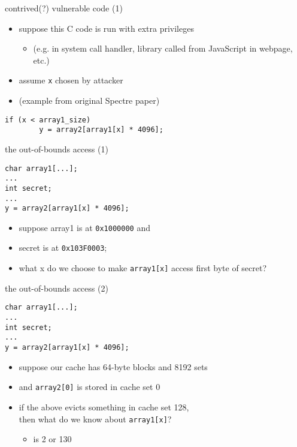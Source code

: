 \begin{frame}[fragile]{contrived(?) vulnerable code (1)}
\begin{itemize}
\item suppose this C code is run with extra privileges
    \begin{itemize}
    \item (e.g. in system call handler, library called from JavaScript in webpage, etc.)
    \end{itemize}
\item assume \texttt{x} chosen by attacker
\item (example from original Spectre paper)
\end{itemize}
\begin{lstlisting}
if (x < array1_size)
        y = array2[array1[x] * 4096];
\end{lstlisting}
\end{frame}

\begin{frame}[fragile]{the out-of-bounds access (1)}
\begin{lstlisting}
char array1[...];
...
int secret;
...
y = array2[array1[x] * 4096];
\end{lstlisting}
\begin{itemize}
\item suppose array1 is at \texttt{0x1000000} and
\item secret is at \texttt{0x103F0003};
\item what x do we choose to make \lstinline|array1[x]| access first byte of secret?
\end{itemize}
\end{frame}

\begin{frame}[fragile]{the out-of-bounds access (2)}
\begin{lstlisting}
char array1[...];
...
int secret;
...
y = array2[array1[x] * 4096];
\end{lstlisting}
\begin{itemize}
\item suppose our cache has 64-byte blocks and 8192 sets
\item and \lstinline|array2[0]| is stored in cache set 0
\vspace{.5cm}
\item if the above evicts something in cache set 128, \\
      then what do we know about \texttt{array1[x]}?
    \begin{itemize}
    \item<2-> is 2 or 130
    \end{itemize}
\end{itemize}
\end{frame}

